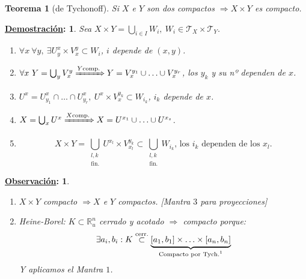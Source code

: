 \documentclass[10pt,a4paper,openright]{book}
\theoremstyle{break}
\newtheorem*{theo}{Teorema}
\newtheorem*{demo}{\underline{Demostración}:}
\newtheorem*{obs}{\underline{Observación}:}
\begin{document}
\begin{theo}[de Tychonoff]
Si $X$ e $Y$ son dos compactos $\Rightarrow X \times Y$ es compacto.
\end{theo}
\begin{demo}
Sea $X \times Y = \bigcup_{i \in  I} W_i,\ W_i \in \mathcal{T}_X \times \mathcal{T}_Y$.
\begin{enumerate}
    \item $\forall x\ \forall y,\ \exists U_y^x \times V_x^y \subset W_i$, $i$ depende de $\left( x, y \right)$.
    \item $\forall x\ Y = \bigcup_{y} V_x^y \xRightarrow{Y \text{comp.}} Y = V_x^{y_1} \cup \ldots \cup V_x^{y_r}$, los $y_k$ y su nº dependen de $x$.
    \item $U^x = U_{y_1}^x \cap \ldots \cap U_{y_r}^x,\ U^x \times V_x^{y_k} \subset W_{i_k}$, $i_k$ depende de $x$.
    \item $X = \bigcup_{x} U^x \xRightarrow{X \text{comp.}} X = U^{x_1} \cup \ldots \cup U^{x_s}$.
    \item 
    \[
        X \times Y = \bigcup_{\substack{l, k\\ \text{fin.}}} U^{x_l} \times V_{x_l}^{y_k} \subset \bigcup_{\substack{l, k\\ \text{fin.}}} W_{i_k} \text{, los } i_k \text{ dependen de los } x_l. 
    \]
\end{enumerate}
\end{demo}

\begin{obs}
\begin{enumerate}
    \item $X \times Y$ compacto $\Rightarrow X$ e $Y$ compactos. [Mantra $3$ para proyecciones] 
    \item Heine-Borel: $K \subset \mathbb{R}_u^n$ cerrado y acotado $\Rightarrow$ compacto porque:
    \[
        \exists a_i, b_i: K \stackrel{\text{cerr.}}{\subset} \underbrace{\left[ a_1, b_1 \right] \times \ldots \times \left[ a_n, b_n \right]}_{\text{Compacto por Tych.\footnotemark}}  
    \]
    Y aplicamos el Mantra $1$.
\end{enumerate}
\end{obs}
\end{document}
